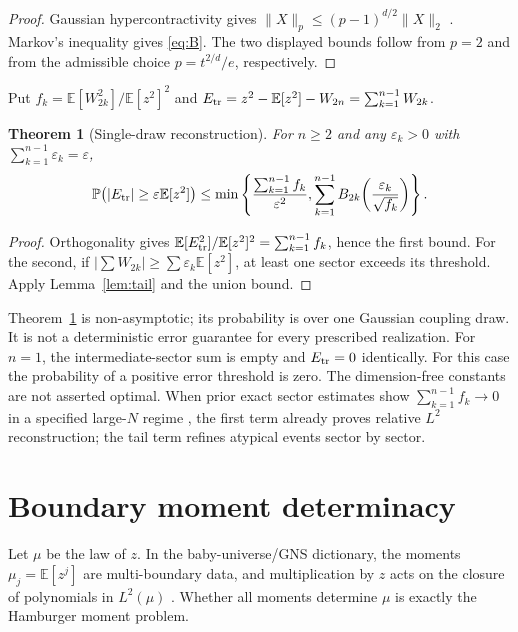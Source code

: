 \documentclass[11pt,a4paper]{article}
\newtheorem{theorem}{Theorem}[section]
\theoremstyle{definition}
\theoremstyle{remark}
\newcommand{\E}{\mathbb{E}}
\newcommand{\Pp}{\mathbb{P}}
\newcommand{\norm}[1]{\lVert#1\rVert}
\begin{document}
\begin{proof}
Gaussian hypercontractivity gives
$\norm{X}_p\le(p-1)^{d/2}\norm{X}_2$ \citep{Nelson1973,Janson1997}.  Markov's inequality
gives \eqref{eq:B}.  The two displayed bounds follow from $p=2$ and from the admissible
choice $p=t^{2/d}/e$, respectively.
\end{proof}

Put $f_k=\E[W_{2k}^2]/\E[z^2]^2$ and
$E_{\rm tr}=z^2-\E[z^2]-W_{2n}=\sum_{k=1}^{n-1}W_{2k}$.

\begin{theorem}[Single-draw reconstruction]\label{thm:single}
For $n\ge2$ and any $\varepsilon_k>0$ with $\sum_{k=1}^{n-1}\varepsilon_k=\varepsilon$,
\begin{equation}
 \Pp\!\left(|E_{\rm tr}|\ge\varepsilon\E[z^2]\right)
 \le\min\left\{\frac{\sum_{k=1}^{n-1}f_k}{\varepsilon^2},
 \sum_{k=1}^{n-1}B_{2k}\!\left(\frac{\varepsilon_k}{\sqrt{f_k}}\right)\right\}.
 \label{eq:single}
\end{equation}
\end{theorem}

\begin{proof}
Orthogonality gives $\E[E_{\rm tr}^2]/\E[z^2]^2=\sum_{k=1}^{n-1}f_k$, hence the first bound.
For the second, if $|\sum W_{2k}|\ge\sum\varepsilon_k\E[z^2]$, at least one sector exceeds
its threshold.  Apply Lemma~\ref{lem:tail} and the union bound.
\end{proof}

Theorem~\ref{thm:single} is non-asymptotic; its probability is over one Gaussian coupling
draw.  It is not a deterministic error guarantee for every prescribed realization.
For $n=1$, the intermediate-sector sum is empty and $E_{\rm tr}=0$ identically.
For this case the probability of a positive error threshold is zero.
The dimension-free constants are not asserted optimal.  When prior exact sector estimates
show $\sum_{k=1}^{n-1}f_k\to0$ in a specified large-$N$ regime \citep{Mukhametzhanov2022}, the
first term already proves relative $L^2$ reconstruction; the tail term refines atypical
events sector by sector.

\section{Boundary moment determinacy}

Let $\mu$ be the law of $z$.  In the baby-universe/GNS dictionary, the moments
$\mu_j=\E[z^j]$ are multi-boundary data, and multiplication by $z$ acts on the closure of
polynomials in $L^2(\mu)$ \citep{MarolfMaxfield2020,JanssenEtAl2021}.  Whether all moments
determine $\mu$ is exactly the Hamburger moment problem.
\end{document}
